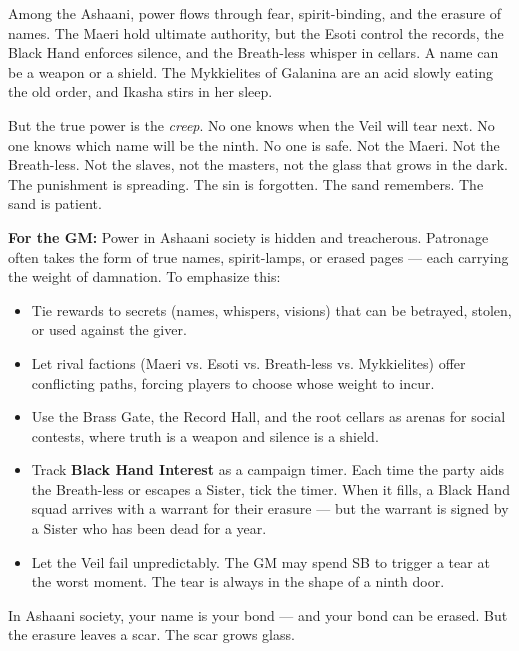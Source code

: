 \begin{tcolorbox}[colback=black!3,colframe=black!40!white,title={Patronage \& Power},breakable]
Among the Ashaani, power flows through fear, spirit-binding, and the erasure of names. The Maeri hold ultimate authority, but the Esoti control the records, the Black Hand enforces silence, and the Breath-less whisper in cellars. A name can be a weapon or a shield. The Mykkielites of Galanina are an acid slowly eating the old order, and Ikasha stirs in her sleep.

But the true power is the \emph{creep}. No one knows when the Veil will tear next. No one knows which name will be the ninth. No one is safe. Not the Maeri. Not the Breath-less. Not the slaves, not the masters, not the glass that grows in the dark. The punishment is spreading. The sin is forgotten. The sand remembers. The sand is patient.

\textbf{For the GM:}  
Power in Ashaani society is hidden and treacherous. Patronage often takes the form of true names, spirit-lamps, or erased pages --- each carrying the weight of damnation. To emphasize this:
\begin{itemize}
\item Tie rewards to secrets (names, whispers, visions) that can be betrayed, stolen, or used against the giver.
\item Let rival factions (Maeri vs. Esoti vs. Breath-less vs. Mykkielites) offer conflicting paths, forcing players to choose whose weight to incur.
\item Use the Brass Gate, the Record Hall, and the root cellars as arenas for social contests, where truth is a weapon and silence is a shield.
\item Track \textbf{Black Hand Interest} as a campaign timer. Each time the party aids the Breath-less or escapes a Sister, tick the timer. When it fills, a Black Hand squad arrives with a warrant for their erasure --- but the warrant is signed by a Sister who has been dead for a year.
\item Let the Veil fail unpredictably. The GM may spend SB to trigger a tear at the worst moment. The tear is always in the shape of a ninth door.
\end{itemize}
In Ashaani society, your name is your bond --- and your bond can be erased. But the erasure leaves a scar. The scar grows glass.
\end{tcolorbox}

